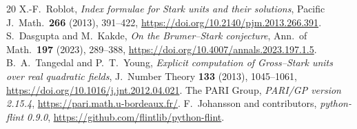 \documentclass[11pt]{article}
\begin{document}
\begin{thebibliography}{20}
X.-F.~Roblot, \emph{Index formulae for Stark units and their
solutions}, Pacific J.\ Math.\ \textbf{266} (2013), 391--422,
\url{https://doi.org/10.2140/pjm.2013.266.391}.
S.~Dasgupta and M.~Kakde, \emph{On the Brumer--Stark conjecture},
Ann.\ of Math.\ \textbf{197} (2023), 289--388,
\url{https://doi.org/10.4007/annals.2023.197.1.5}.
B.~A.~Tangedal and P.~T.~Young, \emph{Explicit computation of
Gross--Stark units over real quadratic fields},
J.\ Number Theory \textbf{133} (2013), 1045--1061,
\url{https://doi.org/10.1016/j.jnt.2012.04.021}.
The PARI Group, \emph{PARI/GP version 2.15.4},
\url{https://pari.math.u-bordeaux.fr/}.
F.~Johansson and contributors, \emph{python-flint 0.9.0},
\url{https://github.com/flintlib/python-flint}.
\end{thebibliography}
\end{document}
